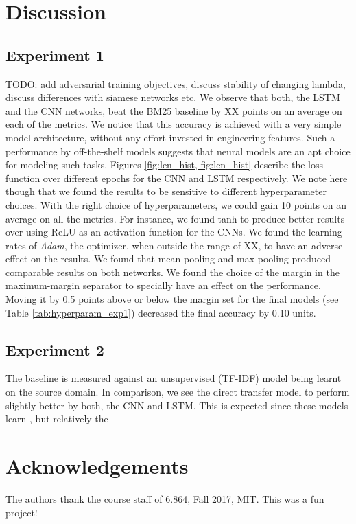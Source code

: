 \documentclass{sigkddExp}
\begin{document}
\section{Discussion}
\label{discussion}
\subsection{Experiment 1}
{\color{red}TODO: add adversarial training objectives, discuss stability of changing lambda, discuss differences with siamese networks etc.}
We observe that both, the LSTM and the CNN networks, beat the \textsf{BM25} baseline by {\color{red}XX points} on an average on each of the metrics. We notice that this accuracy is achieved with a very simple model architecture, without any effort invested in engineering features. Such a performance by off-the-shelf models suggests that neural models are an apt choice for modeling such tasks.  Figures \ref{fig:len_hist, fig:len_hist} describe the loss function over different epochs for the CNN and LSTM respectively. We note here though that we found the results to be sensitive to different hyperparameter choices. With the right choice of hyperparameters, we could gain 10 points on an average on all the metrics. For instance, we found \textsf{tanh} to produce better results over using \textsf{ReLU} as an activation function for the CNNs. We found the learning rates of \textit{Adam}, the optimizer, when outside the range of {\color{red}XX, to have an adverse effect on the results}. We found that mean pooling and max pooling produced comparable results on both networks. We found the choice of the margin in the maximum-margin separator to specially have an effect on the performance. Moving it by 0.5 points above or below the margin set for the final models (see Table \ref{tab:hyperparam_exp1}) decreased the final accuracy by 0.10 units.

\subsection{Experiment 2}
The baseline is measured against an unsupervised (TF-IDF) model being learnt on the \textsf{source} domain. In comparison, we see the direct transfer model to perform slightly better by both, the CNN and LSTM. This is expected since these models learn , but relatively the 
\section{Acknowledgements}
\label{ack}
The authors thank the course staff of 6.864, Fall 2017, MIT. This was a fun project!

%

%
%

\end{document}
